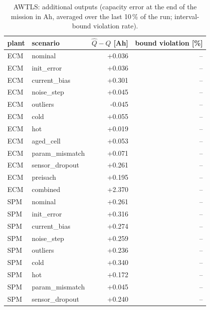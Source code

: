 \begin{table}[H]\centering\small\caption{AWTLS: additional outputs (capacity error at the end of the mission in Ah, averaged over the last 10\,\% of the run; interval-bound violation rate).}\label{tab:cellx_AWTLS}
\begin{tabular}{llrr}\toprule plant & scenario & $\hat Q - Q$ [Ah] & bound violation [\%] \\ \midrule
ECM & nominal & +0.036 & -- \\
ECM & init\_error & +0.036 & -- \\
ECM & current\_bias & +0.301 & -- \\
ECM & noise\_step & +0.045 & -- \\
ECM & outliers & -0.045 & -- \\
ECM & cold & +0.055 & -- \\
ECM & hot & +0.019 & -- \\
ECM & aged\_cell & +0.053 & -- \\
ECM & param\_mismatch & +0.071 & -- \\
ECM & sensor\_dropout & +0.261 & -- \\
ECM & preisach & +0.195 & -- \\
ECM & combined & +2.370 & -- \\
SPM & nominal & +0.261 & -- \\
SPM & init\_error & +0.316 & -- \\
SPM & current\_bias & +0.274 & -- \\
SPM & noise\_step & +0.259 & -- \\
SPM & outliers & +0.236 & -- \\
SPM & cold & +0.340 & -- \\
SPM & hot & +0.172 & -- \\
SPM & param\_mismatch & +0.045 & -- \\
SPM & sensor\_dropout & +0.240 & -- \\
\bottomrule\end{tabular}\end{table}
